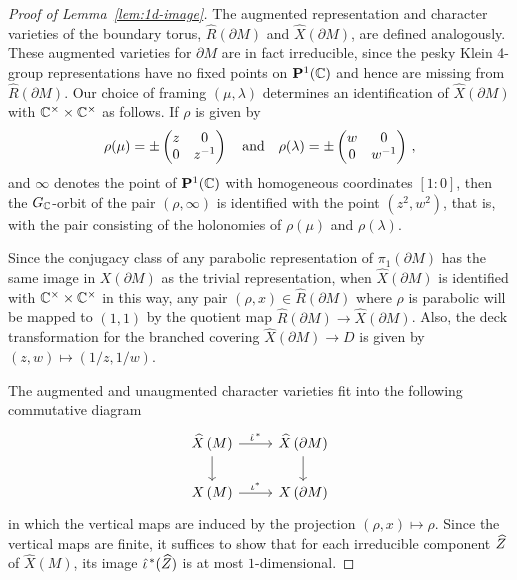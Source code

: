 \documentclass[tikz, sepfignums, defaultenums]{nmd/article}
\newcommand{\SLcharvar}[1]{X\left(#1\right)}
\newcommand{\augcharvar}[1]{\widehat{X}\left(#1\right)}
\newcommand{\augrepvar}[1]{\widehat{R}\left(#1\right)}
\newcommand{\auginc}{\hat\inc\mkern2mu}
\newcommand{\GC}{G_\C}
\newcommand{\inc}{\iota}
\newcommand{\Pone}{\P^1(\C)}
\newcommand{\Cunits}{\C^\times}
\newcommand{\Csquare}{\Cunits\times\Cunits}
\begin{document}
\begin{proof}[Proof of Lemma~\ref{lem:1d-image}]
The augmented representation and character varieties of the boundary
torus, $\augrepvar{\partial M}$ and $\augcharvar{\partial M}$, are
defined analogously.  These augmented varieties for $\partial M$ are
in fact irreducible, since the pesky Klein 4-group representations
have no fixed points on $\Pone$ and hence are missing from
$\augrepvar{\partial M}$.  Our choice of framing $(\mu, \lambda)$
determines an identification of $\augcharvar{\partial M}$ with
$\Csquare$ as follows. If $\rho$ is given by
$$
\rho(\mu) = \pm\left(\begin{matrix}z&0\\0&z^{-1}\end{matrix}\right) \quad \mbox{and} \quad
\rho(\lambda) = \pm\left(\begin{matrix}w&0\\0&w^{-1}\end{matrix}\right)\,,
$$
and $\infty$ denotes the point of $\Pone$ with homogeneous coordinates
$[1:0]$, then the $\GC$-orbit of the pair $(\rho,\infty)$ is
identified with the point $(z^2, w^2)$, that is, with the pair
consisting of the holonomies of $\rho(\mu)$ and $\rho(\lambda)$.

Since the conjugacy class of any parabolic representation of
$\pi_1(\partial M)$ has the same image in $X(\partial M)$ as the
trivial representation, when $\augcharvar{\partial M}$ is identified
with $\Csquare$ in this way, any pair
$(\rho, x)\in\augrepvar{\partial M}$ where $\rho$ is parabolic will be
mapped to $(1, 1)$ by the quotient map
$\augrepvar{\partial M}\to\augcharvar{\partial M}$. Also, the deck
transformation for the branched covering
$\augcharvar{\partial M} \to D$ is given by $(z,w)\mapsto(1/z, 1/w)$.

The augmented and unaugmented character varieties fit into the
following commutative diagram
\[
\begin{tikzcd}
\augcharvar{M} \arrow{r}{\auginc^*} \arrow{d} &
   \augcharvar{\partial M} \arrow{d} \\ 
   \SLcharvar{M} \arrow{r}{\inc^*} & 
   \SLcharvar{\partial M}
\end{tikzcd}
\]
in which the vertical maps are induced by the projection
$(\rho, x) \mapsto \rho$.  Since the vertical maps are finite, it
suffices to show that for each irreducible component $\Zhat$ of
$\augcharvar{M}$, its image $\auginc^*(\Zhat)$ is at most
$1$-dimensional.


\end{proof}
\end{document}
